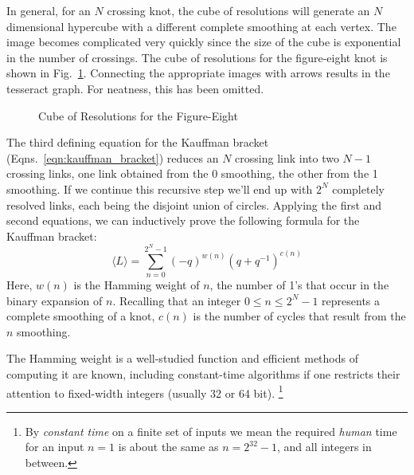         In general, for an $N$ crossing knot, the cube of resolutions will
        generate an $N$ dimensional hypercube with a different complete
        smoothing at each vertex. The image becomes complicated very quickly
        since the size of the cube is exponential in the number of crossings.
        The cube of resolutions for the figure-eight knot is shown in
        Fig.~\ref{fig:figure_eight_knot_cube_of_resolutions}.
        Connecting the appropriate images with arrows results in the tesseract
        graph. For neatness, this has been omitted.
        \begin{figure}
            \centering
            \caption{Cube of Resolutions for the Figure-Eight}
            \label{fig:figure_eight_knot_cube_of_resolutions}
        \end{figure}
        \par\hfill\par
        The third defining equation for the Kauffman bracket
        (Eqns.~\ref{eqn:kauffman_bracket})
        reduces an $N$ crossing link into two $N-1$ crossing
        links, one link obtained from the 0 smoothing, the other from the
        1 smoothing. If we continue this recursive step we'll end up with
        $2^{N}$ completely resolved links, each being the disjoint union of
        circles. Applying the first and second equations, we can inductively
        prove the following formula for the Kauffman bracket:
        \begin{equation}
            \label{eqn:kauffman_bracket}%
            \langle{L}\rangle=\sum_{n=0}^{2^{N}-1}
                (-q)^{w(n)}(q+q^{-1})^{c(n)}
        \end{equation}
        Here, $w(n)$ is the Hamming weight of $n$, the number of 1's
        that occur in the binary expansion of $n$. Recalling that an integer
        $0\leq{n}\leq{2}^{N}-1$ represents a complete smoothing of a knot,
        $c(n)$ is the number of cycles that result from the $n$ smoothing.
        \par\hfill\par
        The Hamming weight is a well-studied function and efficient methods of
        computing it are known, including constant-time algorithms if one
        restricts their attention to fixed-width integers
        (usually 32 or 64 bit).%
        \footnote{
            By \textit{constant time} on a finite set of inputs we mean the
            required \textit{human} time for an input $n=1$ is about the same
            as $n=2^{32}-1$, and all integers in between.
        }
